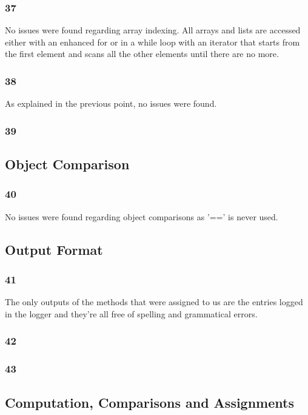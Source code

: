 \documentclass{article}
\begin{document}
\subsubsection{37}
No issues were found regarding array indexing. All arrays and lists are accessed 
either with an enhanced for or in a while loop with an iterator that starts from the
 first element and scans all the other elements until there are no more.
\subsubsection{38}
As explained in the previous point, no issues were found.
\subsubsection{39}
\subsection{Object Comparison}
\subsubsection{40}
No issues were found regarding object comparisons as '==' is never used.
\subsection{Output Format}
\subsubsection{41}
The only outputs of the methods that were assigned to us are the
 entries logged in the logger and they're all free of spelling
 and grammatical errors.
\subsubsection{42}
\subsubsection{43}
\subsection{Computation, Comparisons and Assignments}
\end{document}
